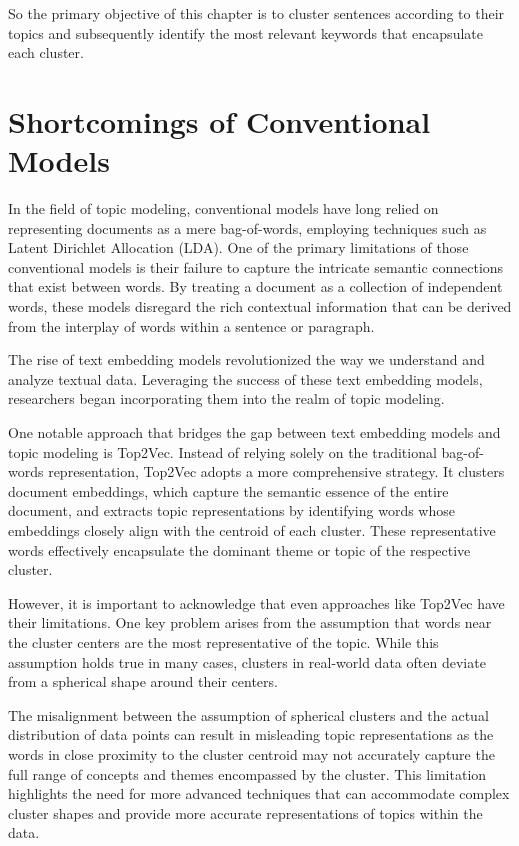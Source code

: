 \documentclass[a4paper,12pt]{report} %
\begin{document}
So the primary objective of this chapter is to cluster sentences according to their topics and subsequently identify the most relevant keywords that encapsulate each cluster.

\section{Shortcomings of Conventional Models}
In the field of topic modeling, conventional models have long relied on representing documents as a mere bag-of-words, employing techniques such as Latent Dirichlet Allocation (LDA). One of the primary limitations of those conventional models is their failure to capture the intricate semantic connections that exist between words. By treating a document as a collection of independent words, these models disregard the rich contextual information that can be derived from the interplay of words within a sentence or paragraph.

The rise of text embedding models revolutionized the way we understand and analyze textual data. Leveraging the success of these text embedding models, researchers began incorporating them into the realm of topic modeling.

One notable approach that bridges the gap between text embedding models and topic modeling is Top2Vec. Instead of relying solely on the traditional bag-of-words representation, Top2Vec adopts a more comprehensive strategy. It clusters document embeddings, which capture the semantic essence of the entire document, and extracts topic representations by identifying words whose embeddings closely align with the centroid of each cluster. These representative words effectively encapsulate the dominant theme or topic of the respective cluster.

However, it is important to acknowledge that even approaches like Top2Vec have their limitations. One key problem arises from the assumption that words near the cluster centers are the most representative of the topic. While this assumption holds true in many cases, clusters in real-world data often deviate from a spherical shape around their centers.

The misalignment between the assumption of spherical clusters and the actual distribution of data points can result in misleading topic representations as the words in close proximity to the cluster centroid may not accurately capture the full range of concepts and themes encompassed by the cluster. This limitation highlights the need for more advanced techniques that can accommodate complex cluster shapes and provide more accurate representations of topics within the data.
\end{document}
